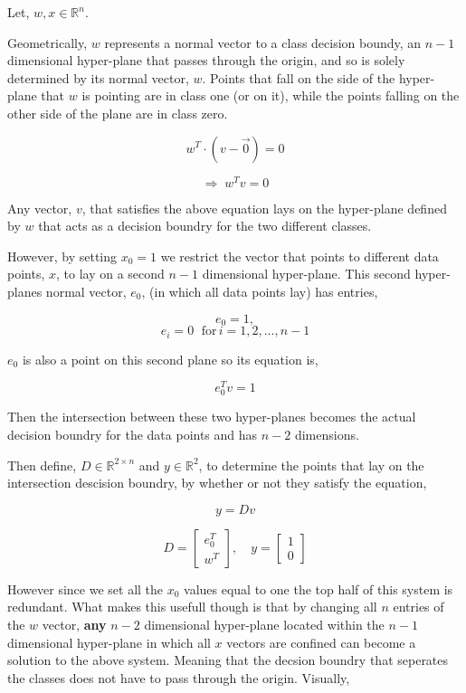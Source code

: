 \documentclass[11pt]{article}
\begin{document}
    Let, \(w,x \in \mathbb{R}^n\).

Geometrically, \(w\) represents a normal vector to a class decision
boundy, an \(n-1\) dimensional hyper-plane that passes through the
origin, and so is solely determined by its normal vector, \(w\). Points
that fall on the side of the hyper-plane that \(w\) is pointing are in
class one (or on it), while the points falling on the other side of the
plane are in class zero.

\[
w^T \cdot ( v - \vec{0} ) = 0
\]

\[
\Rightarrow \; w^T v = 0
\]

Any vector, \(v\), that satisfies the above equation lays on the
hyper-plane defined by \(w\) that acts as a decision boundry for the two
different classes.

However, by setting \(x_0 = 1\) we restrict the vector that points to
different data points, \(x\), to lay on a second \(n-1\) dimensional
hyper-plane. This second hyper-planes normal vector, \(e_0\), (in which
all data points lay) has entries,

\[
e_0 = 1, 
\] \[
e_i = 0 \; \text{  for} \,i = 1, 2, \ldots, n-1
\]

\(e_0\) is also a point on this second plane so its equation is,

\[
 e_0^Tv = 1
\]

    Then the intersection between these two hyper-planes becomes the actual
decision boundry for the data points and has \(n-2\) dimensions.

    Then define, \(D \in \mathbb{R}^{2 \times n}\) and
\(y \in \mathbb{R}^2\), to determine the points that lay on the
intersection descision boundry, by whether or not they satisfy the
equation,

    \[ y = Dv \]

    \[
D = \begin{bmatrix}
e_0^T \\
w^T
\end{bmatrix},
\quad
y = \begin{bmatrix}
1 \\
0
\end{bmatrix}
\]

However since we set all the \(x_0\) values equal to one the top half of
this system is redundant. What makes this usefull though is that by
changing all \(n\) entries of the \(w\) vector, \textbf{any} \(n-2\)
dimensional hyper-plane located within the \(n-1\) dimensional
hyper-plane in which all \(x\) vectors are confined can become a
solution to the above system. Meaning that the decsion boundry that
seperates the classes does not have to pass through the origin.
Visually,
\end{document}
